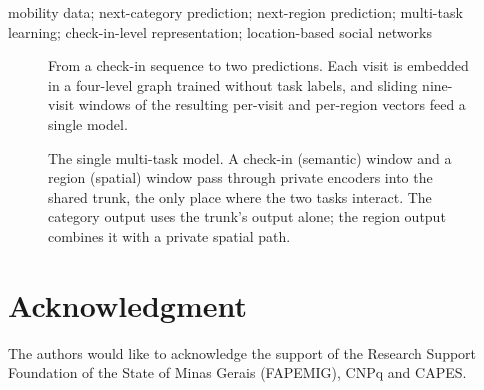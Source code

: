 \documentclass[conference]{IEEEtran}
\begin{document}
\begin{IEEEkeywords}
mobility data; next-category prediction; next-region prediction; multi-task
learning; check-in-level representation; location-based social networks
\end{IEEEkeywords}




\begin{figure}[!t]\centering
\resizebox{\textwidth}{!}{}
\caption{From a check-in sequence to two predictions. Each visit is embedded in a four-level graph
trained without task labels, and sliding nine-visit windows of the resulting per-visit and per-region
vectors feed a single model.}
\label{fig:dataflow}
\end{figure}     %



\begin{figure}[!t]\centering
\resizebox{\columnwidth}{!}{}
\caption{The single multi-task model. A check-in (semantic) window and a region (spatial) window
pass through private encoders into the shared trunk, the only place where the two tasks
interact. The category output uses the trunk's output alone; the region output
combines it with a private spatial path.}
\label{fig:model}
\end{figure}        %









\section*{Acknowledgment}
The authors would like to acknowledge the support of the Research Support Foundation of the
State of Minas Gerais (FAPEMIG), CNPq and CAPES.


\balance

\end{document}
